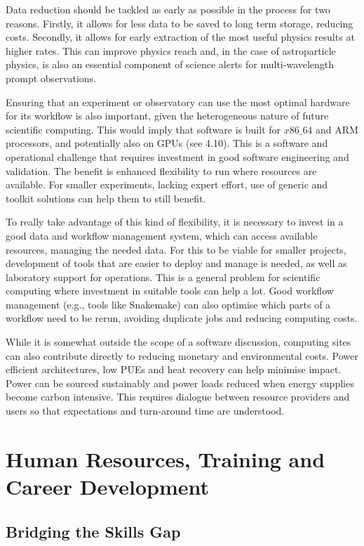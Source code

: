 Data reduction should be tackled as early as possible in the process for two reasons. Firstly, it allows for less data to be saved to long term storage, reducing costs. Secondly, it allows for early extraction of the most useful physics results at higher rates. This can improve physics reach and, in the case of astroparticle physics, is also an essential component of science alerts for multi-wavelength prompt observations.

Ensuring that an experiment or observatory can use the most optimal hardware for its workflow is also important, given the heterogeneous nature of future scientific computing. This would imply that software is built for $x86\_64$ and ARM processors, and potentially also on GPUs (see 4.10). This is a software and operational challenge that requires investment in good software engineering and validation. The benefit is enhanced flexibility to run where resources are available. For smaller experiments, lacking expert effort, use of generic and toolkit solutions can help them to still benefit.

To really take advantage of this kind of flexibility, it is necessary to invest in a good data and workflow management system, which can access available resources, managing the needed data. For this to be viable for smaller projects, development of tools that are easier to deploy and manage is needed, as well as laboratory support for operations. This is a general problem for scientific computing where investment in suitable tools can help a lot. Good workflow management (e.g., tools like Snakemake) can also optimise which parts of a workflow need to be rerun, avoiding duplicate jobs and reducing computing costs.

While it is somewhat outside the scope of a software discussion, computing sites can also contribute directly to reducing monetary and environmental costs. Power efficient architectures, low PUEs and heat recovery can help minimise impact. Power can be sourced sustainably and power loads reduced when energy supplies become carbon intensive. This requires dialogue between resource providers and users so that expectations and turn-around time are understood.


\section{Human Resources, Training and Career Development}

\subsection{Bridging the Skills Gap}

